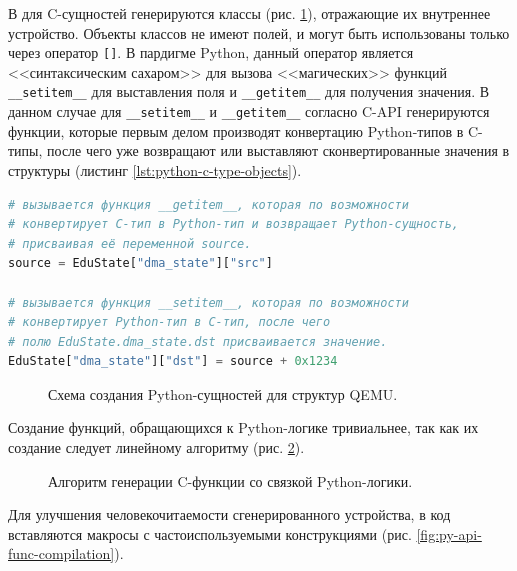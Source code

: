 В {\mylanguage} для C-сущностей генерируются классы (рис. \ref{fig:py-api-compilation}), отражающие их внутреннее устройство.
Объекты классов не имеют полей, и могут быть использованы только через оператор \texttt{[]}.
В пардигме Python, данный оператор является <<синтаксическим сахаром>> для вызова <<магических>>
функций \texttt{\_\_setitem\_\_} для выставления поля и \texttt{\_\_getitem\_\_} для получения значения.
В данном случае для \texttt{\_\_setitem\_\_} и \texttt{\_\_getitem\_\_} согласно C-API \cite{python-c-type-objects}
генерируются функции, которые первым делом производят конвертацию Python-типов в C-типы,
после чего уже возвращают или выставляют сконвертированные значения в структуры (листинг \ref{lst:python-c-type-objects}).

\begin{lstlisting}[caption={Пример доступа к элементу структуры из Python.},
                   captionpos=b,
                   language=python]
# вызывается функция __getitem__, которая по возможности
# конвертирует C-тип в Python-тип и возвращает Python-сущность,
# присваивая её переменной source.
source = EduState["dma_state"]["src"]

# вызывается функция __setitem__, которая по возможности
# конвертирует Python-тип в C-тип, после чего
# полю EduState.dma_state.dst присваивается значение.
EduState["dma_state"]["dst"] = source + 0x1234
\end{lstlisting}\label{lst:python-c-type-objects}

\begin{figure}[!htbp]
    \centering
    \hspace*{-10cm}
    \begin{minipage}{10cm}
        
    \end{minipage}
    \caption{Схема создания Python-сущностей для структур QEMU.}\label{fig:py-api-compilation}
\end{figure}

Создание функций, обращающихся к Python-логике тривиальнее, так как их создание следует
линейному алгоритму (рис. \ref{fig:py-api-func-gen-algo-compilation}).

\begin{figure}[!htbp]
    \centering
    
    \caption{Алгоритм генерации C-функции со связкой Python-логики.}\label{fig:py-api-func-gen-algo-compilation}
\end{figure}

Для улучшения человекочитаемости сгенерированного устройства, в код вставляются макросы с
частоиспользуемыми конструкциями (рис. \ref{fig:py-api-func-compilation}).

